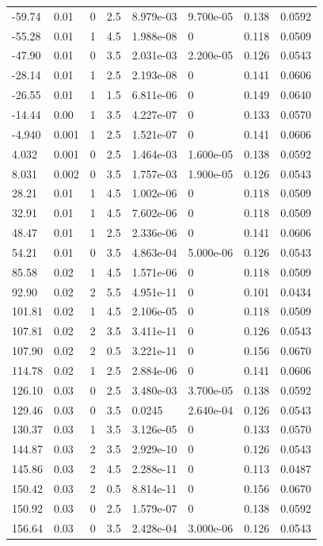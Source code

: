 \documentclass[preview]{standalone}
\begin{document}
{{\begin{tabular}{L{1.2cm}C{1.2cm} C{0.3cm}C{0.5cm} C{1.4cm}C{1.4cm} C{1.4cm}C{1.4cm}}
  -59.74  &  0.01  & 0     & 2.5 &  8.979e-03  & 9.700e-05  & 0.138 &  0.0592   \\ 
  -55.28  &  0.01  & 1     & 4.5 &  1.988e-08  & 0  & 0.118 &  0.0509   \\ 
  -47.90  &  0.01  & 0     & 3.5 &  2.031e-03  & 2.200e-05  & 0.126 &  0.0543   \\ 
  -28.14  &  0.01  & 1     & 2.5 &  2.193e-08  & 0  & 0.141 &  0.0606   \\ 
  -26.55  &  0.01  & 1     & 1.5 &  6.811e-06  & 0  & 0.149 &  0.0640   \\ 
  -14.44  &  0.00  & 1     & 3.5 &  4.227e-07  & 0  & 0.133 &  0.0570   \\ 
  -4.940  &  0.001  & 1     & 2.5 &  1.521e-07  & 0  & 0.141 &  0.0606   \\ 
  4.032  &  0.001  & 0     & 2.5 &  1.464e-03  & 1.600e-05  & 0.138 &  0.0592   \\ 
  8.031  &  0.002  & 0     & 3.5 &  1.757e-03  & 1.900e-05  & 0.126 &  0.0543   \\ 
  28.21  &  0.01  & 1     & 4.5 &  1.002e-06  & 0  & 0.118 &  0.0509   \\ 
  32.91  &  0.01  & 1     & 4.5 &  7.602e-06  & 0  & 0.118 &  0.0509   \\ 
  48.47  &  0.01  & 1     & 2.5 &  2.336e-06  & 0  & 0.141 &  0.0606   \\ 
  54.21  &  0.01  & 0     & 3.5 &  4.863e-04  & 5.000e-06  & 0.126 &  0.0543   \\ 
  85.58  &  0.02  & 1     & 4.5 &  1.571e-06  & 0  & 0.118 &  0.0509   \\ 
  92.90  &  0.02  & 2     & 5.5 &  4.951e-11  & 0  & 0.101 &  0.0434   \\ 
  101.81  &  0.02  & 1     & 4.5 &  2.106e-05  & 0  & 0.118 &  0.0509   \\ 
  107.81  &  0.02  & 2     & 3.5 &  3.411e-11  & 0  & 0.126 &  0.0543   \\ 
  107.90  &  0.02  & 2     & 0.5 &  3.221e-11  & 0  & 0.156 &  0.0670   \\ 
  114.78  &  0.02  & 1     & 2.5 &  2.884e-06  & 0  & 0.141 &  0.0606   \\ 
  126.10  &  0.03  & 0     & 2.5 &  3.480e-03  & 3.700e-05  & 0.138 &  0.0592   \\ 
  129.46  &  0.03  & 0     & 3.5 &  0.0245  & 2.640e-04  & 0.126 &  0.0543   \\ 
  130.37  &  0.03  & 1     & 3.5 &  3.126e-05  & 0  & 0.133 &  0.0570   \\ 
  144.87  &  0.03  & 2     & 3.5 &  2.929e-10  & 0  & 0.126 &  0.0543   \\ 
  145.86  &  0.03  & 2     & 4.5 &  2.288e-11  & 0  & 0.113 &  0.0487   \\ 
  150.42  &  0.03  & 2     & 0.5 &  8.814e-11  & 0  & 0.156 &  0.0670   \\ 
  150.92  &  0.03  & 0     & 2.5 &  1.579e-07  & 0  & 0.138 &  0.0592   \\ 
  156.64  &  0.03  & 0     & 3.5 &  2.428e-04  & 3.000e-06  & 0.126 &  0.0543   \\ 
\hline 
\end{tabular} 

}}
\end{document}
